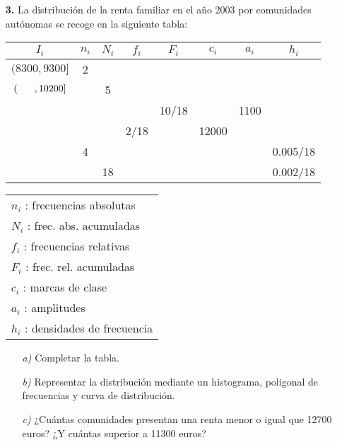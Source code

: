\documentclass[11pt,a4paper]{article}
\theoremstyle{definition}
\begin{document}


\pagebreak

\begin{itemize}
	\item[\textbf{3.}] La distribución de la renta familiar en el año 2003 por comunidades autónomas se recoge en la siguiente tabla:


\begin{table}[!htbp]
\begin{tabular}{|c|c|c|c|c|c|c|c|}
\multicolumn{1}{c|}{$I_i$} & $n_i$ & $N_i$ & $f_i$ & $F_i$ & $c_i$ & $a_i$ & $h_i$ \\ \hline
$(8300, 9300]$				& 2	& 		& 		& 		& 		& 		&  \\
$(\hspace{0.6cm}, 10200]$	& 	& 5		& 		& 		& 		& 		&  \\
							&	& 		& 		& 10/18	& 		& 1100	&  \\
							& 	& 		& 2/18	& 		& 12000	& 		&  \\
							& 4	& 		& 		& 		& 		& 		& 0.005/18 \\
							& 	& 18	&		& 		& 		& 		& 0.002/18 \\ \hline
\end{tabular}
\hspace*{0.2cm}
{
\begin{tabular}{l}
$n_i$ : frecuencias absolutas \\
$N_i$ : frec. abs. acumuladas  \\
$f_i$ : frecuencias relativas \\
$F_i$ : frec. rel. acumuladas \\
$c_i$ : marcas de clase \\
$a_i$ : amplitudes \\
$h_i$ : densidades de frecuencia
\end{tabular}}

\end{table}


	\begin{itemize}
		\item[\emph{a)}] Completar la tabla.
		\item[\emph{b)}] Representar la distribución mediante un histograma, poligonal de frecuencias y curva de distribución.
		\item[\emph{c)}] ¿Cuántas comunidades presentan una renta menor o igual que 12700 euros? ¿Y cuántas superior a 11300 euros?
	\end{itemize}
\end{itemize}
\end{document}
